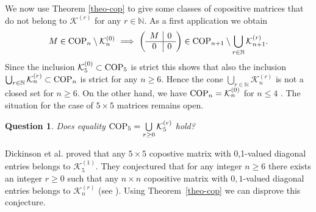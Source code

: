 \documentclass[11pt]{article}
\newcommand{\ignore}[1]{}
\newtheorem{theorem}{Theorem}[section]
\newtheorem{question}[theorem]{Question}
\numberwithin{equation}{section}
\newcommand{\COP}{{\text{\rm COP}}}
\newcommand{\MK}{{\mathcal K}}
\begin{document}
 \ignore{
\begin{theorem}
Let $M$ be a matrix and let $M'$ be the matrtix obtained by adding a zero row-column. If $M' \in \MK_{n+1}^{(r)}$ then $M\in \MK_n^{(0)}$. In particular, if $M_1\notin \MK_n^{(0)}$ then $M' \notin \MK_{n+1}^{(r)}$ for all $r\in \mathbb{N}$
\end{theorem}
\begin{proof}
By construction $P_M(x)=P_{M'}(x)$. Assume that $M' \in \MK_{n+1}^{(r)}$, then the poynomial $p(x_1, x_2, \dots, x_n, x_{n+1})=P_M(x)(\sum_{i=1}^{n+1}x_i^2)^r$ is a sum of squares, then $q:=p(x_1, \dots, x_n, 1)= P_M(x)(\sum_{i=1}^{n}x_i^2 + 1)^r$ is also a sum of squares. By decomposing $q$ in homogeneous polynomials we obtain that the least degree homogeneous part is of degree 4 and is precisely $P_M(x)$. By Lemma \ref{least-degree} we obtain that $P_M(x)$ is a sum of squares, i.e, $M\in \MK_n^{(0)}$.
\end{proof}
}

We now use Theorem \ref{theo-cop} to give some classes of copositive matrices that do not belong to $\MK^{(r)}$ for any $r\in \mathbb{N}$.  As a first application we obtain %
\begin{equation}\label{zero-col}
M\in \COP_n\setminus \MK_n^{(0)} \ \Longrightarrow \ \left(\begin{array}{c|c}
M & 0\\
\hline
0 & 0
\end{array}
\right) \in \COP_{n+1}\setminus \bigcup\limits_{r\in \mathbb{N}} \MK_{n+1}^{(r)}.
\end{equation}
Since the inclusion $\MK^{(0)}_5\subset \COP_5$ is strict this shows that also the inclusion $ \bigcup_{r\in\mathbb{N}}\MK_n^{(r)}\subset \COP_n$ is strict for any $n\ge 6$. Hence the cone  $\bigcup_{r\in\mathbb{N}}\MK_n^{(r)}$ is not a closed set for $n\ge 6$. On the other hand,  we have $\COP_n=\MK_n^{(0)}$ for $n\leq 4$ \cite{Diananda}. The situation for the case of $5\times 5$ matrices remains open.

\begin{question}
Does equality $\COP_5 = \bigcup\limits_{r\ge 0}\MK_5^{(r)}$ hold?
\end{question}

Dickinson et al. \cite{DDGH} proved that any $5\times 5$ copostive matrix with 0,1-valued  diagonal entries belongs to $\MK_5^{(1)}$. They  conjectured that for any integer $n\ge 6$ there exists an integer $r\ge 0$ such that any $n\times n$ copositive matrix with $0,1$-valued  diagonal entries  belongs to $\MK_n^{(r)}$ (see \cite[Conjecture 1]{DDGH}).  Using Theorem~\ref{theo-cop} we can disprove this conjecture.
\end{document}
